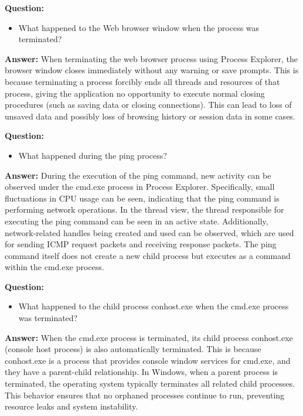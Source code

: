 \documentclass[12pt,a4paper]{article}
\begin{document}
\textbf{Question:}
\begin{itemize}
    \item What happened to the Web browser window when the process was terminated?
\end{itemize}

\textbf{Answer:}
When terminating the web browser process using Process Explorer, the browser window closes immediately without any warning or save prompts. This is because terminating a process forcibly ends all threads and resources of that process, giving the application no opportunity to execute normal closing procedures (such as saving data or closing connections). This can lead to loss of unsaved data and possibly loss of browsing history or session data in some cases.

\textbf{Question:}
\begin{itemize}
    \item What happened during the ping process?
\end{itemize}

\textbf{Answer:}
During the execution of the ping command, new activity can be observed under the cmd.exe process in Process Explorer. Specifically, small fluctuations in CPU usage can be seen, indicating that the ping command is performing network operations. In the thread view, the thread responsible for executing the ping command can be seen in an active state. Additionally, network-related handles being created and used can be observed, which are used for sending ICMP request packets and receiving response packets. The ping command itself does not create a new child process but executes as a command within the cmd.exe process.

\textbf{Question:}
\begin{itemize}
    \item What happened to the child process conhost.exe when the cmd.exe process was terminated?
\end{itemize}

\textbf{Answer:}
When the cmd.exe process is terminated, its child process conhost.exe (console host process) is also automatically terminated. This is because conhost.exe is a process that provides console window services for cmd.exe, and they have a parent-child relationship. In Windows, when a parent process is terminated, the operating system typically terminates all related child processes. This behavior ensures that no orphaned processes continue to run, preventing resource leaks and system instability.
\end{document}
